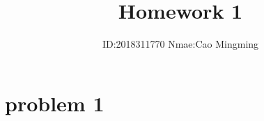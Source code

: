 \documentclass[]{article}
\title{Homework 1}
\author{ID:2018311770 \indent \indent \indent Nmae:Cao Mingming}
\begin{document}
\maketitle


\section{problem 1}
\end{document}

